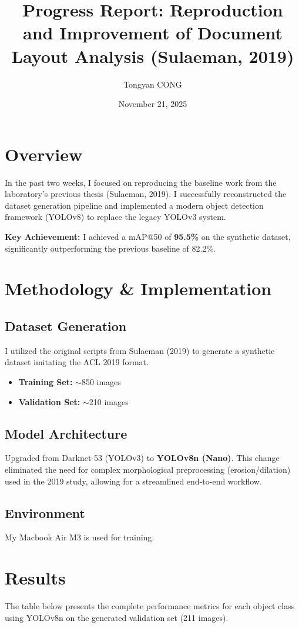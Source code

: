 \documentclass{article}
\title{\textbf{Progress Report: Reproduction and Improvement of Document Layout Analysis (Sulaeman, 2019)}}
\author{Tongyan CONG}
\date{November 21, 2025}
\begin{document}
\maketitle

\section{Overview}
In the past two weeks, I focused on reproducing the baseline work from the laboratory's previous thesis (Sulaeman, 2019). I successfully reconstructed the dataset generation pipeline and implemented a modern object detection framework (YOLOv8) to replace the legacy YOLOv3 system.

\noindent \textbf{Key Achievement:} I achieved a mAP@50 of \textbf{95.5\%} on the synthetic dataset, significantly outperforming the previous baseline of 82.2\%.

\section{Methodology \& Implementation}
\subsection{Dataset Generation}
I utilized the original scripts from Sulaeman (2019) to generate a synthetic dataset imitating the ACL 2019 format.
\begin{itemize}
    \item \textbf{Training Set:} $\sim$850 images
    \item \textbf{Validation Set:} $\sim$210 images
\end{itemize}

\subsection{Model Architecture}
Upgraded from Darknet-53 (YOLOv3) to \textbf{YOLOv8n (Nano)}. This change eliminated the need for complex morphological preprocessing (erosion/dilation) used in the 2019 study, allowing for a streamlined end-to-end workflow.

\subsection{Environment}
My Macbook Air M3 is used for training.

\section{Results}
The table below presents the complete performance metrics for each object class using YOLOv8n on the generated validation set (211 images).
\end{document}
